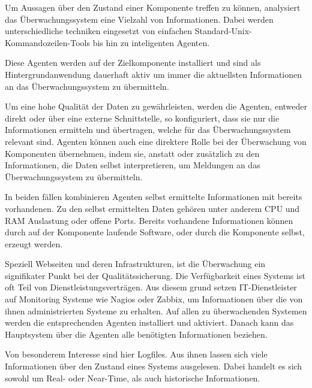 Um Aussagen über den Zustand einer Komponente treffen zu können, analysiert das Überwachungssystem eine Vielzahl von Informationen. Dabei werden unterschiedliche techniken eingesetzt von einfachen Standard-Unix-Kommandozeilen-Tools bis hin zu inteligenten Agenten.

Diese Agenten werden auf der Zielkomponente installiert und sind als Hintergrundanwendung dauerhaft aktiv um immer die aktuellsten Informationen an das Überwachungssystem zu übermitteln.

Um eine hohe Qualität der Daten zu gewährleisten, werden die Agenten, entweder direkt oder über eine externe Schnittstelle, so konfiguriert, dass sie nur die Informationen ermitteln und übertragen, welche für das Überwachungssystem relevant sind. Agenten können auch eine direktere Rolle bei der Überwachung von Komponenten übernehmen, indem sie, anstatt oder zusätzlich zu den Informationen, die Daten selbst interpretieren, um Meldungen an das Überwachungssystem zu übermitteln.

In beiden fällen kombinieren Agenten selbst ermittelte Informationen mit bereits vorhandenen. Zu den selbst ermittelten Daten gehören unter anderem CPU und RAM Auslastung oder offene Ports. Bereits vorhandene Informationen können durch auf der Komponente laufende Software, oder durch die Komponente selbst, erzeugt werden.

Speziell Webseiten und deren Infrastrukturen, ist die Überwachung ein signifikater Punkt bei der Qualitätssicherung. Die Verfügbarkeit eines Systems ist oft Teil von Dienstleistungsverträgen. Aus diesem grund setzen IT-Dienstleister auf Monitoring Systeme wie \gls{Nagios} oder \gls{Zabbix}, um Informationen über die von ihnen administrierten Systeme zu erhalten. Auf allen zu überwachenden Systemen werden die entsprechenden Agenten installiert und aktiviert. Danach kann das Hauptsystem über die Agenten alle benötigten Informationen beziehen.

Von besonderem Interesse sind hier Logfiles. Aus ihnen lassen sich viele Informationen über den Zustand eines Systems ausgelesen. Dabei handelt es sich sowohl um Real- oder Near-Time, als auch historische Informationen.


